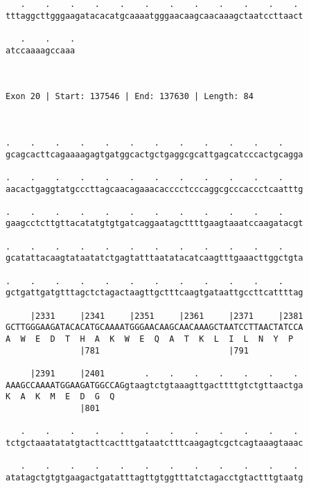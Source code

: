 \documentclass{article}
\begin{document}
\begin{Verbatim}
   .    .    .    .    .    .    .    .    .    .    .    . 
tttaggcttgggaagatacacatgcaaaatgggaacaagcaacaaagctaatccttaact
                                                            
   .    .    .
atccaaaagccaaa
              
              
 
Exon 20 | Start: 137546 | End: 137630 | Length: 84



.    .    .    .    .    .    .    .    .    .    .    .    
gcagcacttcagaaaagagtgatggcactgctgaggcgcattgagcatcccactgcagga
                                                            
.    .    .    .    .    .    .    .    .    .    .    .    
aacactgaggtatgcccttagcaacagaaacacccctcccaggcgcccaccctcaatttg
                                                            
.    .    .    .    .    .    .    .    .    .    .    .    
gaagcctcttgttacatatgtgtgatcaggaatagcttttgaagtaaatccaagatacgt
                                                            
.    .    .    .    .    .    .    .    .    .    .    .    
gcatattacaagtataatatctgagtatttaatatacatcaagtttgaaacttggctgta
                                                            
.    .    .    .    .    .    .    .    .    .    .    .    
gctgattgatgtttagctctagactaagttgctttcaagtgataattgccttcattttag
                                                            
     |2331     |2341     |2351     |2361     |2371     |2381
GCTTGGGAAGATACACATGCAAAATGGGAACAAGCAACAAAGCTAATCCTTAACTATCCA
A  W  E  D  T  H  A  K  W  E  Q  A  T  K  L  I  L  N  Y  P  
               |781                          |791           
  
     |2391     |2401        .    .    .    .    .    .    . 
AAAGCCAAAATGGAAGATGGCCAGgtaagtctgtaaagttgacttttgtctgttaactga
K  A  K  M  E  D  G  Q                                      
               |801                                         
  
   .    .    .    .    .    .    .    .    .    .    .    . 
tctgctaaatatatgtacttcactttgataatctttcaagagtcgctcagtaaagtaaac
                                                            
   .    .    .    .    .    .    .    .    .    .    .    . 
atatagctgtgtgaagactgatatttagttgtggtttatctagacctgtactttgtaatg
                                                            

\end{Verbatim}
\end{document}
